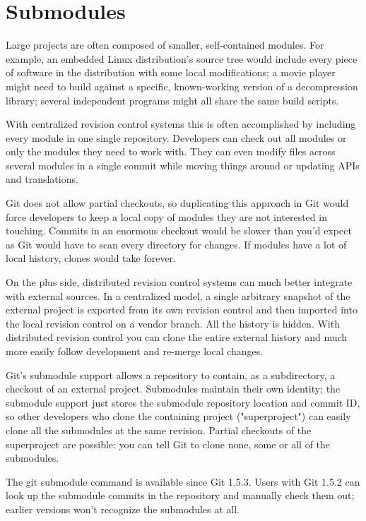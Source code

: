 \section{Submodules}
Large projects are often composed of smaller, self-contained modules. For
example, an embedded Linux distribution's source tree would include every piece
of software in the distribution with some local modifications; a movie player
might need to build against a specific, known-working version of a
decompression library; several independent programs might all share the same
build scripts.

With centralized revision control systems this is often accomplished by
including every module in one single repository. Developers can check out all
modules or only the modules they need to work with. They can even modify files
across several modules in a single commit while moving things around or
updating APIs and translations.

Git does not allow partial checkouts, so duplicating this approach in Git would
force developers to keep a local copy of modules they are not interested in
touching. Commits in an enormous checkout would be slower than you'd expect as
Git would have to scan every directory for changes. If modules have a lot of
local history, clones would take forever.

On the plus side, distributed revision control systems can much better
integrate with external sources. In a centralized model, a single arbitrary
snapshot of the external project is exported from its own revision control and
then imported into the local revision control on a vendor branch. All the
history is hidden. With distributed revision control you can clone the entire
external history and much more easily follow development and re-merge local
changes.

Git's submodule support allows a repository to contain, as a subdirectory, a
checkout of an external project. Submodules maintain their own identity; the
submodule support just stores the submodule repository location and commit ID,
so other developers who clone the containing project ("superproject") can
easily clone all the submodules at the same revision. Partial checkouts of the
superproject are possible: you can tell Git to clone none, some or all of the
submodules.

The git submodule command is available since Git 1.5.3. Users with Git 1.5.2
can look up the submodule commits in the repository and manually check them
out; earlier versions won't recognize the submodules at all.

